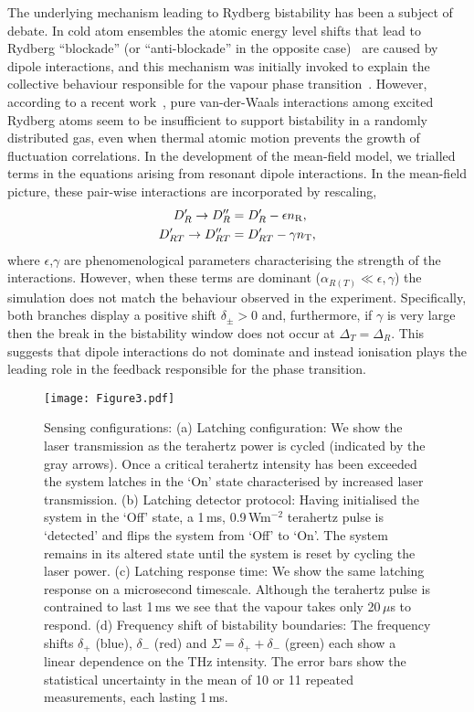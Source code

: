 \documentclass[twocolumn,aps,prl,nobibnotes,8pt]{revtex4-1}
\newcommand{\be}{\begin{equation}}
\newcommand{\ee}{\end{equation}}
\newcommand{\rind}{R}
\newcommand{\tind}{T}
\begin{document}
The underlying mechanism leading to Rydberg bistability has been a subject of debate.
In cold atom ensembles the atomic energy level shifts that lead to Rydberg ``blockade'' (or ``anti-blockade'' in the opposite case)~\cite{Ates07, Amthor10, Lesanovsky13, Lesanovsky14} are caused by dipole interactions, and this mechanism was initially invoked to explain the collective behaviour responsible for the vapour phase transition~\cite{Carr13}. 
However, according to a recent work~\cite{Sibalic16}, pure van-der-Waals interactions among excited Rydberg atoms seem to be insufficient to support bistability in a randomly distributed gas, even when thermal atomic motion prevents the growth of fluctuation correlations.
In the development of the mean-field model, we trialled terms in the equations arising from resonant dipole interactions. 
In the mean-field picture, these pair-wise interactions are incorporated by rescaling,
\be
\begin{split}
	D_\rind'  \to D_\rind'' & = D_\rind' - \epsilon n_{\rm{R}}, \\
	D_{\rind \tind}' \to D_{\rind \tind}'' & = D_{\rind \tind}' - \gamma n_{\rm{T}},%
	\label{eq:drdtDIPOLE}
\end{split}
\ee
where $\epsilon$,$\gamma$ are phenomenological parameters characterising the strength of the interactions. 
However, when these terms are dominant ($\alpha_{\rind (\tind)} \ll \epsilon , \gamma$) the simulation does not match the behaviour observed in the experiment.
Specifically, both branches display a positive shift $\delta_{\pm} > 0$ and, furthermore, if $\gamma$ is very large then the break in the bistability window does not occur at $\Delta_\tind = \Delta_\rind$.
This suggests that dipole interactions do not dominate and instead ionisation plays the leading role in the feedback responsible for the phase transition.

%
%
%
\begin{figure*}
\texttt{[image: Figure3.pdf]} 
\caption[]
{\label{fig:3} Sensing configurations:
(a) Latching configuration: We show the laser transmission as the terahertz power is cycled (indicated by the gray arrows).
Once a critical terahertz intensity has been exceeded the system latches in the `On' state characterised by increased laser transmission.
(b) Latching detector protocol: Having initialised the system in the `Off' state, a 1\,ms, 0.9\,Wm$^{-2}$ terahertz pulse is `detected' and flips the system from `Off' to `On'. 
The system remains in its altered state until the system is reset by cycling the laser power.
(c) Latching response time: We show the same latching response on a microsecond timescale. 
Although the terahertz pulse is contrained to last 1\,ms we see that the vapour takes only 20\,$\mu$s to respond.
(d) Frequency shift of bistability boundaries: The frequency shifts $\delta_{+}$ (blue), $\delta_{-}$ (red) and $\Sigma = \delta_{+} + \delta_{-}$ (green) each show a linear dependence on the THz intensity.
The error bars show the statistical uncertainty in the mean of 10 or 11 repeated measurements, each lasting 1\,ms.
}
\end{figure*}
%
%
%
\end{document}
